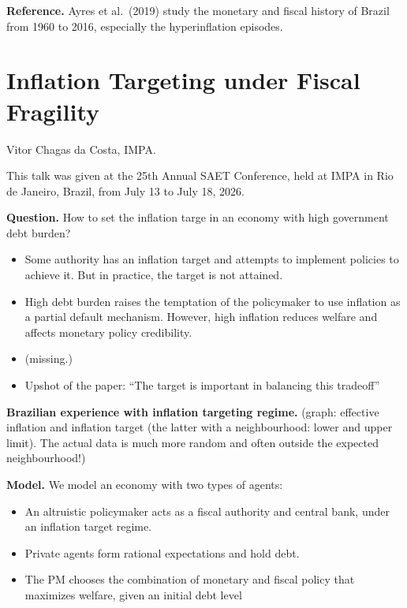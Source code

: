\medskip\noindent
{\bf Reference.}
Ayres et al.\ (2019) study the
monetary and fiscal history of Brazil
from 1960 to 2016, especially the
hyperinflation episodes.




\section{Inflation Targeting under
Fiscal Fragility}
\label{section-inflation-targeting}

\medskip\noindent
Vitor Chagas da Costa,
IMPA.

\medskip\noindent
This talk was given at the 25th Annual
SAET Conference, held at IMPA in Rio de
Janeiro, Brazil, from July 13 to
July 18, 2026.


\medskip\noindent
{\bf Question.} How to set the inflation
targe in an economy with high government
debt burden?

\begin{itemize}
\item Some authority has an inflation target
and attempts to implement policies to
achieve it. But in practice, the target is
not attained.

\item High debt burden raises the temptation
of the policymaker to use inflation as a
partial default mechanism. However, high
inflation reduces welfare and affects
monetary policy credibility.

\item (missing.)

\item Upshot of the paper:
``The target is important in balancing
this tradeoff''
\end{itemize}

\medskip\noindent
{\bf Brazilian experience with inflation
targeting regime.} (graph: effective
inflation and inflation target 
(the latter with a neighbourhood: lower
and upper limit). The actual data is much
more random and often outside the expected
neighbourhood!)

\medskip\noindent
{\bf Model.} We model an economy with two
types of agents:
\begin{itemize}
\item An altruistic policymaker acts as a
fiscal authority and central bank, under an
inflation target regime.

\item Private agents form rational
expectations and hold debt.
\item The PM chooses the combination of
monetary and fiscal policy that maximizes
welfare, given an initial debt level
\end{itemize}

